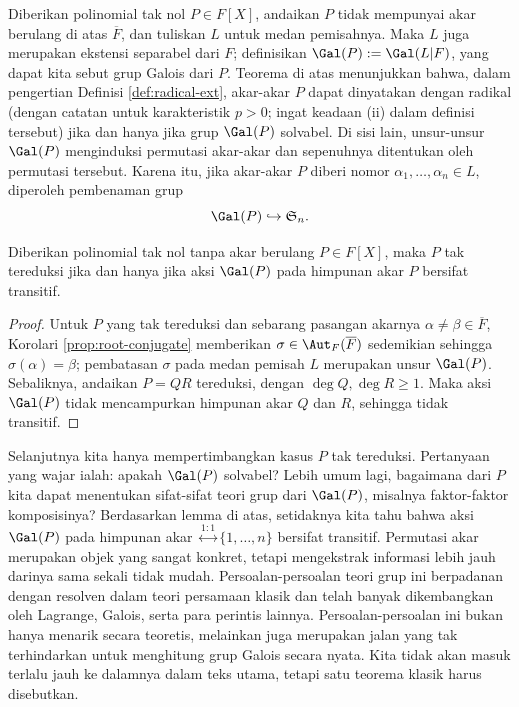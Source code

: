 Diberikan polinomial tak nol $P \in F[X]$, andaikan $P$ tidak mempunyai akar berulang di atas $\overline{F}$, dan tuliskan $L$ untuk medan pemisahnya. Maka $L$ juga merupakan ekstensi separabel dari $F$; definisikan $\Gal(P) := \Gal(L|F)$, yang dapat kita sebut grup Galois dari $P$. Teorema di atas menunjukkan bahwa, dalam pengertian Definisi \ref{def:radical-ext}, akar-akar $P$ dapat dinyatakan dengan radikal (dengan catatan untuk karakteristik $p > 0$; ingat keadaan (ii) dalam definisi tersebut) jika dan hanya jika grup $\Gal(P)$ solvabel. Di sisi lain, unsur-unsur $\Gal(P)$ menginduksi permutasi akar-akar dan sepenuhnya ditentukan oleh permutasi tersebut. Karena itu, jika akar-akar $P$ diberi nomor $\alpha_1, \ldots, \alpha_n \in L$, diperoleh pembenaman grup
\[ \Gal(P) \hookrightarrow \mathfrak{S}_n. \]

\begin{lemma}\label{prop:mult-root-transitivity}
	Diberikan polinomial tak nol tanpa akar berulang $P \in F[X]$, maka $P$ tak tereduksi jika dan hanya jika aksi $\Gal(P)$ pada himpunan akar $P$ bersifat transitif.
\end{lemma}
\begin{proof}
	Untuk $P$ yang tak tereduksi dan sebarang pasangan akarnya $\alpha \neq \beta \in \overline{F}$, Korolari \ref{prop:root-conjugate} memberikan $\sigma \in \Aut_F(\overline{F})$ sedemikian sehingga $\sigma(\alpha) = \beta$; pembatasan $\sigma$ pada medan pemisah $L$ merupakan unsur $\Gal(P)$. Sebaliknya, andaikan $P = QR$ tereduksi, dengan $\deg Q, \deg R \geq 1$. Maka aksi $\Gal(P)$ tidak mencampurkan himpunan akar $Q$ dan $R$, sehingga tidak transitif.
\end{proof}

Selanjutnya kita hanya mempertimbangkan kasus $P$ tak tereduksi. Pertanyaan yang wajar ialah: apakah $\Gal(P)$ solvabel? Lebih umum lagi, bagaimana dari $P$ kita dapat menentukan sifat-sifat teori grup dari $\Gal(P)$, misalnya faktor-faktor komposisinya? Berdasarkan lemma di atas, setidaknya kita tahu bahwa aksi $\Gal(P)$ pada himpunan akar $\stackrel{1:1}{\longleftrightarrow} \{1, \ldots, n\}$ bersifat transitif. Permutasi akar merupakan objek yang sangat konkret, tetapi mengekstrak informasi lebih jauh darinya sama sekali tidak mudah. Persoalan-persoalan teori grup ini berpadanan dengan resolven dalam teori persamaan klasik dan telah banyak dikembangkan oleh Lagrange, Galois, serta para perintis lainnya. Persoalan-persoalan ini bukan hanya menarik secara teoretis, melainkan juga merupakan jalan yang tak terhindarkan untuk menghitung grup Galois secara nyata. Kita tidak akan masuk terlalu jauh ke dalamnya dalam teks utama, tetapi satu teorema klasik harus disebutkan.

